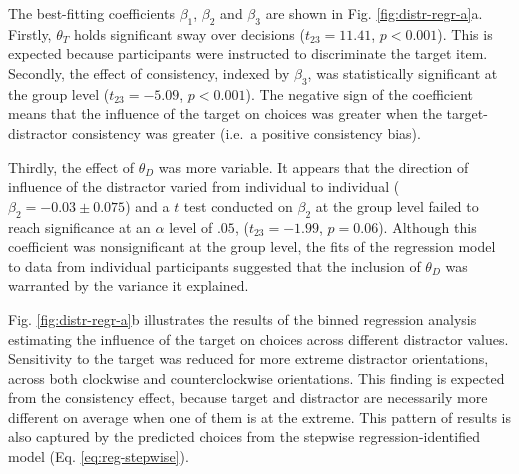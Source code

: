 \documentclass[a4paper, nobind]{templates/ociamthesis}
\begin{document}
The best-fitting coefficients \(\beta_1\), \(\beta_2\) and \(\beta_3\) are shown in Fig. \ref{fig:distr-regr-a}a. Firstly, \(\theta_T\) holds significant sway over decisions (\(t_{23}=11.41\), \(p<0.001\)). This is expected because participants were instructed to discriminate the target item. Secondly, the effect of consistency, indexed by \(\beta_3\), was statistically significant at the group level (\(t_{23}=-5.09\), \(p<0.001\)). The negative sign of the coefficient means that the influence of the target on choices was greater when the target-distractor consistency was greater (i.e.~a positive consistency bias).

Thirdly, the effect of \(\theta_D\) was more variable. It appears that the direction of influence of the distractor varied from individual to individual (\(\beta_2 = -0.03 \pm 0.075\)) and a \(t\) test conducted on \(\beta_2\) at the group level failed to reach significance at an \(\alpha\) level of \(.05\), (\(t_{23}=-1.99\), \(p=0.06\)). Although this coefficient was nonsignificant at the group level, the fits of the regression model to data from individual participants suggested that the inclusion of \(\theta_D\) was warranted by the variance it explained.

Fig. \ref{fig:distr-regr-a}b illustrates the results of the binned regression analysis estimating the influence of the target on choices across different distractor values. Sensitivity to the target was reduced for more extreme distractor orientations, across both clockwise and counterclockwise orientations. This finding is expected from the consistency effect, because target and distractor are necessarily more different on average when one of them is at the extreme. This pattern of results is also captured by the predicted choices from the stepwise regression-identified model (Eq. \eqref{eq:reg-stepwise}).
\end{document}
